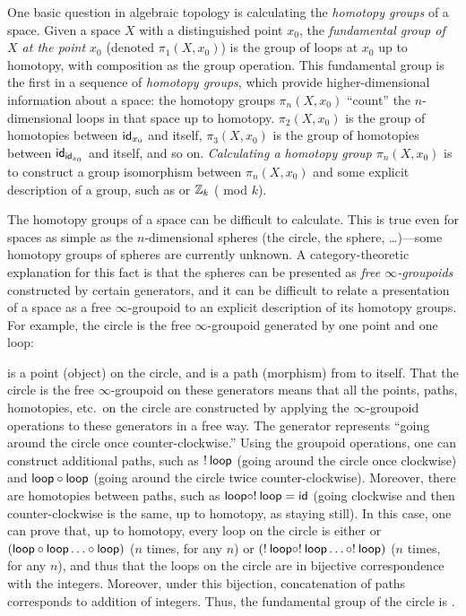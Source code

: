 One basic question in algebraic topology is calculating the
\emph{homotopy groups} of a space.  Given a space $X$ with a
distinguished point $x_0$, the \emph{fundamental group of $X$ at the point $x_0$} (denoted
$\pi_1(X,x_0)$) is the group of loops at $x_0$ up to homotopy, with composition as the group operation.
This fundamental group is the first in a sequence of \emph{homotopy
  groups}, which provide higher-dimensional information about a space:
the homotopy groups $\pi_n(X,x_0)$ ``count'' the $n$-dimensional loops in 
that space up to homotopy.  $\pi_2(X,x_0)$ is the group of homotopies between
$\mathsf{id}_{{x_0}}$ and itself, $\pi_3(X,x_0)$ is the group of homotopies
between $\mathsf{id}_{\mathsf{id}_{{x_0}}}$ and itself, and so on.
\emph{Calculating a homotopy group $\pi_n(X,x_0)$} is to construct a group isomorphism
between $\pi_n(X,x_0)$ and some explicit description of a group,
such as \Z\/ or $\mathbb{Z}_k$ (\Z\/ mod $k$).  

The homotopy groups of a space can be difficult to calculate.  This is
true even for spaces as simple as the $n$-dimensional spheres (the
circle, the sphere, \ldots)---some homotopy groups of spheres are
currently unknown.  A category-theoretic explanation for this fact is
that the spheres can be presented as \emph{free
  $\infty$-groupoids} constructed by certain generators, and it can be
difficult to relate a presentation of a space as a free
$\infty$-groupoid to an explicit description of its homotopy groups.
For example, the circle is the free $\infty$-groupoid generated by one point
and one loop:
%
\begin{center}
\end{center}
%
%
 is a point (object) on the circle, and  is a path
(morphism) from  to itself.  That the circle is the free
$\infty$-groupoid on these generators means that all the points, paths,
homotopies, etc.~on the circle are constructed by applying the
$\infty$-groupoid operations to these generators in a free way.  The generator
 represents ``going around the circle once
counter-clockwise.''  Using the groupoid operations, one can construct
additional paths, such as $! \: \mathsf{loop}$ (going around the circle once
clockwise) and $\mathsf{loop} \mathbin{\circ} \mathsf{loop}$ (going around the circle
twice counter-clockwise).  Moreover, there are homotopies between paths,
such as $\mathsf{loop} \mathbin{\circ} ! \: \mathsf{loop} = \mathsf{id}$ (going clockwise and
then counter-clockwise is the same, up to homotopy, as staying still).
In this case, one can prove that, up to homotopy,
every loop on the circle is either  or $(\mathsf{loop} \mathbin{\circ}
\mathsf{loop} \ldots \mathbin{\circ} \mathsf{loop})$ ($n$ times, for any $n$) or $(! \: 
\mathsf{loop} \mathbin{\circ} ! \:   \mathsf{loop} \ldots \mathbin{\circ} ! \:  \mathsf{loop})$ ($n$ times,
for any $n$), and thus that the loops on the circle are in bijective
correspondence with the integers.  Moreover, under this bijection, concatenation of paths corresponds to
addition of integers.  Thus, the fundamental group of the
circle is \Z.

